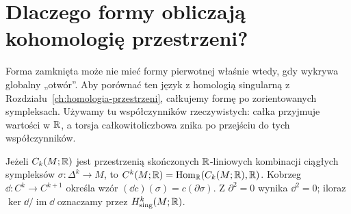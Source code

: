 \section{Dlaczego formy obliczają kohomologię przestrzeni?}
\label{sec:twierdzenie-de-rhama}

Forma zamknięta może nie mieć formy pierwotnej właśnie wtedy,
gdy wykrywa globalny „otwór”. Aby porównać ten język
z homologią singularną z Rozdziału~\ref{ch:homologia-przestrzeni},
całkujemy formę po zorientowanych sympleksach.
Używamy tu współczynników rzeczywistych: całka przyjmuje
wartości w $\mathbb{R}$, a torsja całkowitoliczbowa znika po
przejściu do tych współczynników.

\begin{definicja}
\label{def:singular-cohom-r}
Jeżeli $C_k(M;\mathbb{R})$ jest przestrzenią skończonych
$\mathbb{R}$-liniowych kombinacji ciągłych sympleksów
$\sigma:\Delta^k\to M$, to
$C^k(M;\mathbb{R})=\operatorname{Hom}_{\mathbb{R}}(C_k(M;\mathbb{R}),\mathbb{R})$.
Kobrzeg $\dd:C^k\to C^{k+1}$ określa wzór
$(\dd c)(\sigma)=c(\partial\sigma)$.
Z $\partial^2=0$ wynika $\dd^2=0$; iloraz
$\ker\dd/\operatorname{im}\dd$ oznaczamy przez
$H^k_{\mathrm{sing}}(M;\mathbb{R})$.
\end{definicja}

